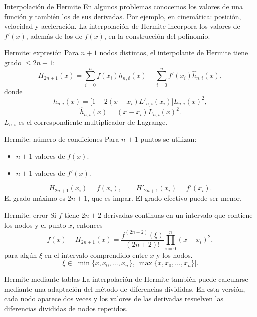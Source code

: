 \documentclass[original_version/main.tex]{subfiles}
\begin{document}
\graphicspath{{imagenes/tema10/}{../imagenes/tema10/}}

\begin{frame}[t]{Interpolación de Hermite}
En algunos problemas conocemos los valores de una función y también los de sus derivadas.
\bigskip
Por ejemplo, en cinemática: posición, velocidad y aceleración.
\bigskip
La interpolación de Hermite incorpora los valores de $f'(x)$, además de los de $f(x)$, en la construcción del polinomio.
\end{frame}
\begin{frame}[t]{Hermite: expresión}
\small Para $n+1$ nodos distintos, el interpolante de Hermite tiene grado $\le2n+1$:
\[H_{2n+1}(x)=\sum_{i=0}^n f(x_i)h_{n,i}(x)+\sum_{i=0}^n f'(x_i)\widehat h_{n,i}(x),\]
donde
\[h_{n,i}(x)=\big[1-2(x-x_i)L'_{n,i}(x_i)\big]L_{n,i}(x)^2,\]
\[\widehat h_{n,i}(x)=(x-x_i)L_{n,i}(x)^2.\]
$L_{n,i}$ es el correspondiente multiplicador de Lagrange.
\end{frame}
\begin{frame}[t]{Hermite: número de condiciones}
Para $n+1$ puntos se utilizan:
\begin{itemize}
\item $n+1$ valores de $f(x)$.
\item $n+1$ valores de $f'(x)$.
\end{itemize}
\[H_{2n+1}(x_i)=f(x_i),\qquad H'_{2n+1}(x_i)=f'(x_i).\]
El grado máximo es $2n+1$, que es impar. El grado efectivo puede ser menor.
\end{frame}
\begin{frame}[t]{Hermite: error}
\small Si $f$ tiene $2n+2$ derivadas continuas en un intervalo que contiene los nodos y el punto $x$, entonces
\[f(x)-H_{2n+1}(x)=\frac{f^{(2n+2)}(\xi)}{(2n+2)!}\prod_{i=0}^n(x-x_i)^2,\]
para algún $\xi$ en el intervalo comprendido entre $x$ y los nodos.
\[\xi\in\big[\min\{x,x_0,\ldots,x_n\},\ \max\{x,x_0,\ldots,x_n\}\big].\]
\end{frame}
\begin{frame}[t]{Hermite mediante tablas}
La interpolación de Hermite también puede calcularse mediante una adaptación del método de diferencias divididas.
\bigskip
En esta versión, cada nodo aparece dos veces y los valores de las derivadas resuelven las diferencias divididas de nodos repetidos.
\end{frame}
\end{document}
